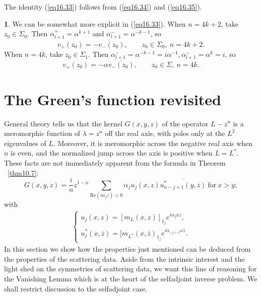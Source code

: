 \documentclass{surv-l}
\theoremstyle{plain}
\theoremstyle{definition}
\newtheorem{remark}[theorem]{\sc{Remark}}
\numberwithin{equation}{chapter}
\begin{document}
The identity (\ref{eq16.33}) follows from (\ref{eq16.34}) and (\ref{eq16.35}).
\setcounter{theorem}{35}
\begin{remark}\label{rem16.36}
We can be somewhat more explicit in (\ref{eq16.33}). When $n= 4k+2$, take $z_{0}\in\Sigma_{0}$. Then $\alpha_{l+1}^{+}=\alpha^{k+1}$ and $\alpha_{l+1}^{-}=\alpha^{-k-1}$, so
\setcounter{equation}{36}
\begin{equation}\label{eq16.37}
v_{+}(z_{0})=\overline{-v_{-}(z_{0})},\qquad z_{0}\in\Sigma_{0},\ n=4k+2.
\end{equation}
When $n=4k$, take $z_{0}\in\Sigma_{1}$. Then $\alpha_{l+1}^{-}=\alpha^{-k-1}=i\alpha^{-1},\alpha_{l+1}^{-}=\alpha^{k}=i$, so
\begin{equation}\label{eq16.38}
v_{+}(z_{0})=-\alpha\overline{v_{-}(z_{0})},\qquad  z_{0}\in\Sigma,\ n=4k.
\end{equation}
\end{remark}

\section{The Green's function revisited}\label{sec17}
General theory tells us that the kernel $G(x, y, z)$ of the operator $L-z^{n}$ is a meromorphic function of $\lambda=z^{n}$ off the real axis, with poles only at the $L^{2}$ eigenvalues of $L$. Moreover, it is meromorphic across the negative real axis when $n$ is even, and the normalized jump across the axis is positive when $L=L^{*}$. These facts are not immediately apparent from the formula in Theorem ~\ref{thm10.7}:
\setcounter{equation}{0}
\begin{equation}\label{eq17.1}
G(x,y, z)=\frac{i}{n}z^{1-n}\sum_{\mathrm{Re}(i\alpha_{j}z)<0}\alpha_{j}u_{j}(x,z)\overline{u_{n-j+1}^{*}(y,\overline{z})}\ \mathrm{for}\ x>y;
\end{equation}
with
\begin{align}\label{eq17.2}
\left\{\begin{array}{l}
u_{j}(x, z)=[m_{L}(x,z)]_{1_{j}}e^{i\alpha_{j}xz},\\
u_{j}^{*} (x,\overline{z})=[m_{{{L}}^{{\ast}}}(x,\overline{z})_{1_{j}}e^{i\overline{\alpha}_{-j+1}x\overline{z}}.
\end{array}\right.
\end{align}
In this section we show how the properties just mentioned can be deduced from the properties of the scattering data. Aside from the intrinsic interest and the light shed on the symmetries of scattering data, we want this line of reasoning for the Vanishing Lemma which is at the heart of the selfadjoint inverse problem. We shall restrict discussion to the selfadjoint case.
\end{document}
